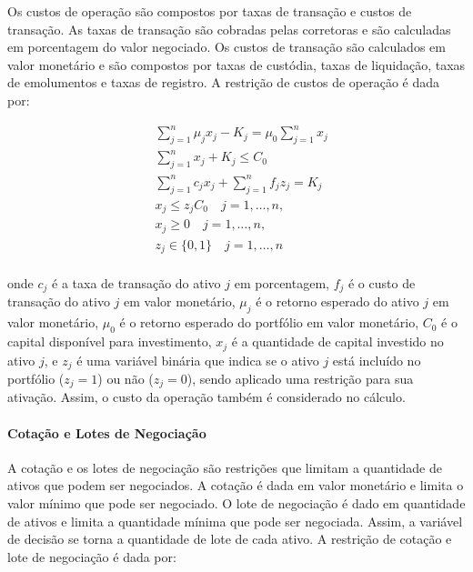                     \ipar Os custos de operação são compostos por taxas de transação e custos de transação. As taxas de transação são cobradas pelas corretoras e são calculadas em porcentagem do valor negociado. Os custos de transação são calculados em valor monetário e são compostos por taxas de custódia, taxas de liquidação, taxas de emolumentos e taxas de registro. A restrição de custos de operação é dada por:

                    \begin{equation}
                        \begin{aligned}
                        & \sum_{j=1}^{n}\mu_{j}x_{j}- K_{j} = \mu_{0} \sum_{j=1}^{n}x_{j}\\
                        & \sum_{j=1}^{n} x_{j} + K_{j} \leq C_{0} \\
                        & \sum_{j=1}^{n}c_{j}x_{j} + \sum_{j=1}^{n} f_{j} z_{j} = K_{j} \\
                        & x_{j} \leq z_{j} C_{0} \quad j=1, \ldots, n \text{,} \\
                        & x_{j} \geq 0 \quad j=1, \ldots, n \text{,} \\
                        & z_{j} \in\{0,1\} \quad j=1, \ldots, n \\
                        \end{aligned}
                    \end{equation}

                    \noindent onde $c_{j}$ é a taxa de transação do ativo $j$ em porcentagem, $f_{j}$ é o custo de transação do ativo $j$ em valor monetário, $\mu_{j}$ é o retorno esperado do ativo $j$ em valor monetário, $\mu_{0}$ é o retorno esperado do portfólio em valor monetário, $C_{0}$ é o capital disponível para investimento, $x_{j}$ é a quantidade de capital investido no ativo $j$, e $z_{j}$ é uma variável binária que indica se o ativo $j$ está incluído no portfólio ($z_{j}=1$) ou não ($z_{j}=0$), sendo aplicado uma restrição para sua ativação. Assim, o custo da operação também é considerado no cálculo.

                \paragraph{Cotação e Lotes de Negociação}

                    \ipar A cotação e os lotes de negociação são restrições que limitam a quantidade de ativos que podem ser negociados. A cotação é dada em valor monetário e limita o valor mínimo que pode ser negociado. O lote de negociação é dado em quantidade de ativos e limita a quantidade mínima que pode ser negociada. Assim, a variável de decisão se torna a quantidade de lote de cada ativo. A restrição de cotação e lote de negociação é dada por:

